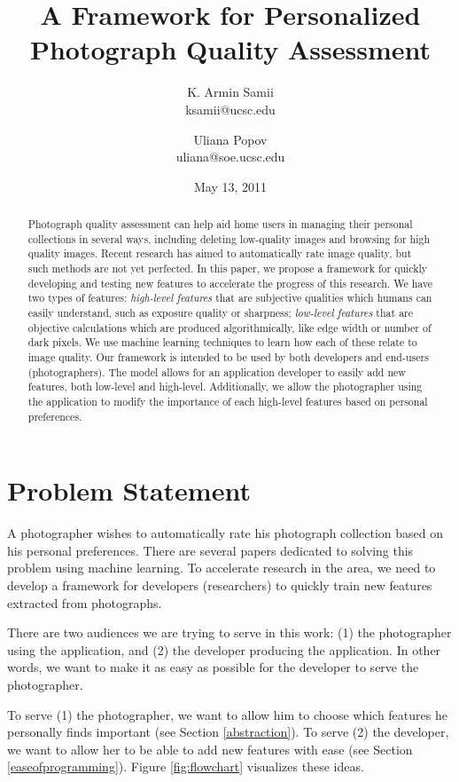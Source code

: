 \documentclass[11pt,letter]{article}
\title{A Framework for Personalized Photograph Quality Assessment}
\author{
K. Armin Samii \\
ksamii@ucsc.edu
\and
Uliana Popov \\
uliana@soe.ucsc.edu}
\date{May 13, 2011}
\begin{document}
\maketitle
\begin{abstract}
Photograph quality assessment can help aid home users in managing their personal collections in several ways, including deleting low-quality images and browsing for high quality images. Recent research has aimed to automatically rate image quality, but such methods are not yet perfected. In this paper, we propose a framework for quickly developing and testing new features to accelerate the progress of this research. We have two types of features: \textit{high-level features} that are subjective qualities which humans can easily understand, such as exposure quality or sharpness; \textit{low-level features} that are objective calculations which are produced algorithmically, like edge width or number of dark pixels. We use machine learning techniques to learn how each of these relate to image quality. 
Our framework is intended to be used by both developers and end-users (photographers). 
The model allows for an application developer to easily add new features, both low-level and high-level. Additionally, we allow the photographer using the application to modify the importance of each high-level features based on personal preferences.

\end{abstract}

\section{Problem Statement}
A photographer wishes to automatically rate his photograph collection based on his personal preferences. There are several papers dedicated to solving this problem using machine learning\cite{springerlink:10.1007/11744078_23}\cite{springerlink:10.1007/978-3-642-10543-2_23}\cite{Yeh:2010:PPR:1873951.1873963}. To accelerate research in the area, we need to develop a framework for developers (researchers) to quickly train new features extracted from photographs.

There are two audiences we are trying to serve in this work: (1) the photographer using the application, and (2) the developer producing the application. In other words, we want to make it as easy as possible for the developer to serve the photographer.

To serve (1) the photographer, we want to allow him to choose which features he personally finds important (see Section \ref{abstraction}). To serve (2) the developer, we want to allow her to be able to add new features with ease (see Section \ref{easeofprogramming}). Figure \ref{fig:flowchart} visualizes these ideas.
\end{document}
